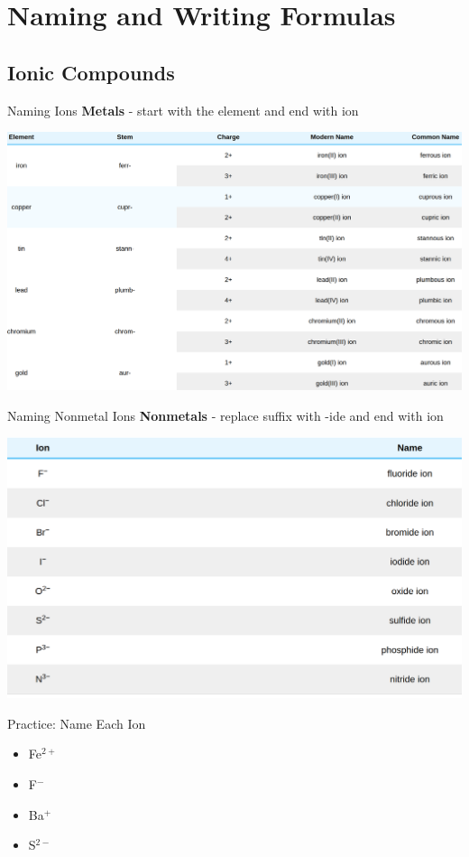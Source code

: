 \documentclass[11pt]{beamer}
\begin{document}
\section{Naming and Writing Formulas}

\subsection{Ionic Compounds}

\begin{frame}{Naming Ions}
  \textbf{Metals} - start with the element and end with ion

  \centering
  \includegraphics[width=\linewidth]{ions_names}
\end{frame}

\begin{frame}{Naming Nonmetal Ions}
  \textbf{Nonmetals} - replace suffix with -ide and end with ion

  \centering
  \includegraphics[width=\linewidth]{nonmetal_ions}
\end{frame}

\begin{frame}{Practice: Name Each Ion}
  \begin{itemize}
  \item Fe$^{2+}$
  \item F$^-$
  \item Ba$^+$
  \item S$^{2-}$
  \end{itemize}
\end{frame}
\end{document}
